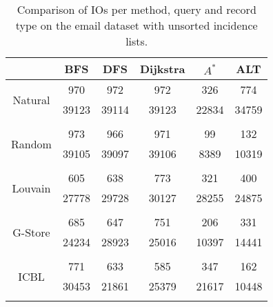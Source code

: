 \begin{table}
	\begin{center}
		 \begin{tabular}[c]{c c c c c c} \toprule
			  & BFS & DFS & Dijkstra & $A^*$  & ALT \\ \midrule 
 			\multirow{2}{*}{Natural}  & 970 & 972 & 972 & 326 & 774 \\ 
 				 & 39123 & 39114 & 39123 & 22834 & 34759 \\ 
 				&&&&& \\[-0.5em]
 			\multirow{2}{*}{Random}  & 973 & 966 & 971 & 99 & 132 \\ 
 				 & 39105 & 39097 & 39106 & 8389 & 10319 \\ 
 				&&&&& \\[-0.5em]
 			\multirow{2}{*}{Louvain}  & 605 & 638 & 773 & 321 & 400 \\ 
 				 & 27778 & 29728 & 30127 & 28255 & 24875 \\ 
 				&&&&& \\[-0.5em]
 			\multirow{2}{*}{G-Store}  & 685 & 647 & 751 & 206 & 331 \\ 
 				 & 24234 & 28923 & 25016 & 10397 & 14441 \\ 
 				&&&&& \\[-0.5em]
 			\multirow{2}{*}{ICBL}  & 771 & 633 & 585 & 347 & 162 \\ 
 				 & 30453 & 21861 & 25379 & 21617 & 10448 \\ 
 				&&&&& \\[-0.5em]
 					\end{tabular}  
  	 \end{center}
	 \caption{Comparison of IOs per method, query and record type on the email dataset with unsorted incidence lists.}
	 \label{email-uns}
\end{table}
